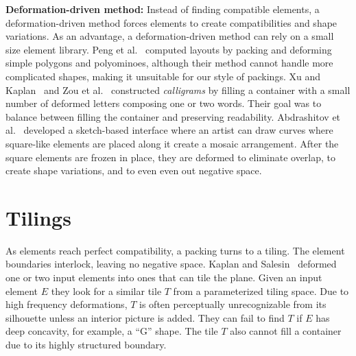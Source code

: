 
\textbf{Deformation-driven method:}
Instead of finding compatible elements,
a deformation-driven method forces elements to create compatibilities and shape variations.
As an advantage, a deformation-driven method can rely on a small size element library.
Peng et al.~\cite{Peng2014} computed layouts by packing and deforming
simple polygons and polyominoes, although their method cannot handle more
complicated shapes, making it unsuitable for our style of packings.
Xu and Kaplan~\cite{Xu2007} and Zou et al.~\cite{Zou2016}
constructed \textit{calligrams} by filling a container with a small
number of deformed letters composing one or two words.  
Their goal was to balance between filling the container and preserving readability.
Abdrashitov et al.~\cite{Abdrashitov2014} developed
a sketch-based interface where an artist can draw curves where square-like elements are placed along it
create a mosaic arrangement.
After the square elements are frozen in place, 
they are deformed to eliminate overlap, to create shape variations, 
and to even even out negative space.  


\section{Tilings}
As elements reach perfect compatibility, a packing turns to a tiling.
The element boundaries interlock, leaving no negative space.
Kaplan and Salesin~\cite{Kaplan2000, Kaplan2004} deformed one or two 
input elements into ones that can tile the plane.
Given an input element $E$ they look for a similar tile $T$
from a parameterized tiling space.
Due to high frequency deformations,
$T$ is often perceptually unrecognizable from its silhouette unless an interior picture is added.
They can fail to find $T$ if $E$ has deep concavity, for example, a ``G'' shape.
The tile $T$ also cannot fill a container due to its highly structured boundary.


